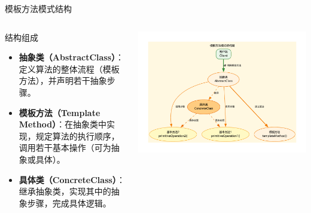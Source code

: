 \documentclass[UTF8,aspectratio=169]{beamer}
\begin{document}
\begin{frame}{模板方法模式结构}
    \begin{columns}
        \begin{column}{0.38\textwidth}
            \begin{ytublock}{结构组成}
                \begin{itemize}
                    \item \textbf{抽象类（AbstractClass）}：定义算法的整体流程（模板方法），并声明若干抽象步骤。
                    \item \textbf{模板方法（Template Method）}：在抽象类中实现，规定算法的执行顺序，调用若干基本操作（可为抽象或具体）。
                    \item \textbf{具体类（ConcreteClass）}：继承抽象类，实现其中的抽象步骤，完成具体逻辑。
                \end{itemize}
            \end{ytublock}
        \end{column}
        \begin{column}{0.58\textwidth}
            \begin{center}
                \includegraphics[width=1.0\textwidth]{images/template_method_pattern.pdf}
            \end{center}
        \end{column}
    \end{columns}
\end{frame}
\end{document}
